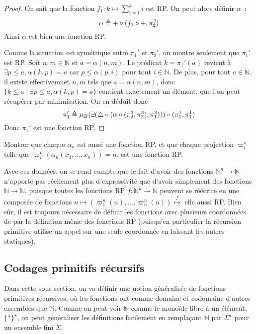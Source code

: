 \begin{proof}
  On sait que la fonction $f_1 : k \mapsto \sum_{i = 1}^k i$ est RP. On peut
  alors définir $\alpha$~:
  \[\alpha \triangleq + \circ (f_1\circ +,\pi_2^2)\]
  Ainsi $\alpha$ est bien une fonction RP.

  Comme la situation est symétrique entre $\pi_1'$ et $\pi_2'$, on montre
  seulement que $\pi_1'$ est RP. Soit $n,m\in \mathbb N$ et $a = \alpha(n,m)$.
  Le prédicat $k = \pi_1'(a)$ revient à $\exists p \leq a,\alpha(k,p) = a$ car
  $p \leq \alpha(p,i)$ pour tout $i\in\mathbb N$. De plus, pour tout
  $a\in \mathbb N$, il existe effectivemnet $n,m$ tels que $a = \alpha(n,m)$,
  donc $\{k \leq a \mid \exists p\leq a, \alpha(k,p) = a\}$
  contient exactement un élément, que l'on peut récupérer par minimisation.
  On en déduit donc
  \[\pi_1' \triangleq \mu_B (\exists(\triangle\circ
  (\alpha\circ (\pi_2^3,\pi_3^3), \pi_1^3)))\circ (\pi_1^1,\pi_1^1)\]
  Donc $\pi_1'$ est une fonction RP.
\end{proof}

\begin{exercise}
  Montrer que chaque $\alpha_n$ est aussi une fonction RP, et que chaque
  projection $\varpi_i^n$ telle que $\varpi_i^n(\alpha_n(x_1,\ldots,x_n)) = n$,
  est une fonction RP.
\end{exercise}

Avec ces données, on se rend compte que le fait d'avoir des fonctions
$\mathbb N^n \to \mathbb N$ n'apporte pas réellement plus d'expressivité que
d'avoir simplement des fonctions $\mathbb N \to \mathbb N$, puisque toutes les
fonctions RP $f : \mathbb N^k \to \mathbb N$ peuvent se réécrire en une
composée de fonctions
$n \mapsto (\varpi_1^n(n),\ldots,\varpi_n^n(n)) \overset{f}{\mapsto}$ elle aussi
RP. Bien sûr, il est toujours nécessaire de définir les fonctions avec plusieurs
coordonnées de par la définition même des fonctions RP (puisqu'en particulier
la récursion primitive utilise un appel sur une seule coordonnée en laissant les
autres statiques).

\subsection{Codages primitifs récursifs}

Dans cette sous-section, on va définir une notion généralisée de fonctions
primitives récursives, où les fonctions ont comme domaine et codomaine d'autres
ensembles que $\mathbb N$. Comme on peut voir $\mathbb N$ comme le monoïde libre
à un élément, $\{*\}^\star$, on peut généraliser les définitions facilement en
remplaçant $\mathbb N$ par $\Sigma^\star$ pour un ensemble fini $\Sigma$.

